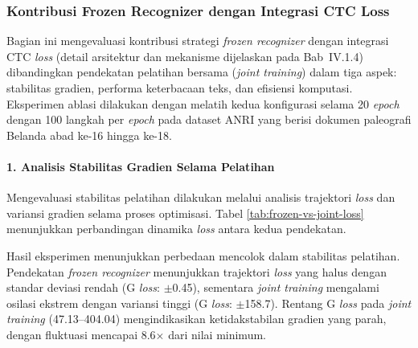 \documentclass[12pt,a4paper]{article}
\begin{document}
\vspace{0.8em}

\subsubsection{Kontribusi Frozen Recognizer dengan Integrasi CTC Loss}
\label{subsubsec:kontribusi-frozen-recognizer}

Bagian ini mengevaluasi kontribusi strategi \textit{frozen recognizer} dengan integrasi CTC \textit{loss} (detail arsitektur dan mekanisme dijelaskan pada Bab~IV.1.4) dibandingkan pendekatan pelatihan bersama (\textit{joint training}) dalam tiga aspek: stabilitas gradien, performa keterbacaan teks, dan efisiensi komputasi. Eksperimen ablasi dilakukan dengan melatih kedua konfigurasi selama 20 \textit{epoch} dengan 100 langkah per \textit{epoch} pada dataset ANRI yang berisi dokumen paleografi Belanda abad ke-16 hingga ke-18.

\vspace{0.5em}

\paragraph{1. Analisis Stabilitas Gradien Selama Pelatihan}

Mengevaluasi stabilitas pelatihan dilakukan melalui analisis trajektori \textit{loss} dan variansi gradien selama proses optimisasi. Tabel \ref{tab:frozen-vs-joint-loss} menunjukkan perbandingan dinamika \textit{loss} antara kedua pendekatan.

\begin{table}[H]
\centering
{}
\caption{Perbandingan Trajektori \textit{Loss} antara \textit{Frozen Recognizer} dan \textit{Joint Training}}
\label{tab:frozen-vs-joint-loss}
\end{table}

Hasil eksperimen menunjukkan perbedaan mencolok dalam stabilitas pelatihan. Pendekatan \textit{frozen recognizer} menunjukkan trajektori \textit{loss} yang halus dengan standar deviasi rendah (G \textit{loss}: $\pm$0.45), sementara \textit{joint training} mengalami osilasi ekstrem dengan variansi tinggi (G \textit{loss}: $\pm$158.7). Rentang G \textit{loss} pada \textit{joint training} (47.13--404.04) mengindikasikan ketidakstabilan gradien yang parah, dengan fluktuasi mencapai 8.6$\times$ dari nilai minimum.
\end{document}
